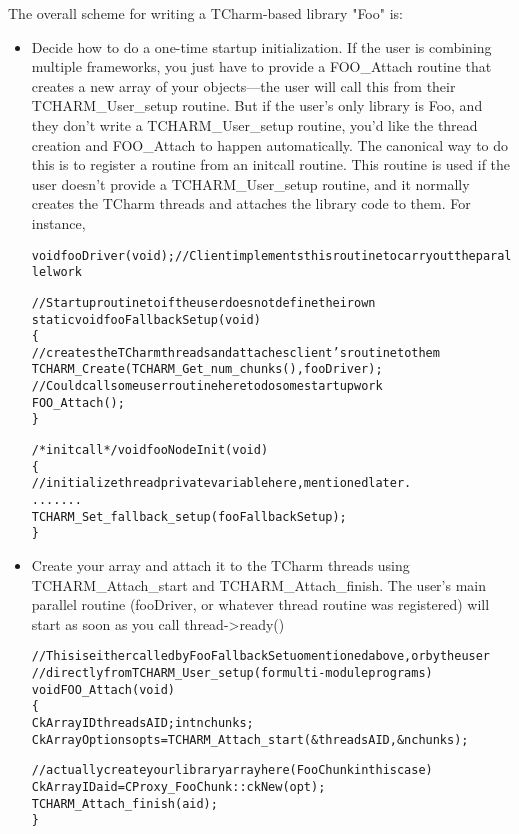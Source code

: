 \documentclass[10pt]{article}
\begin{document}
The overall scheme for writing a TCharm-based library "Foo" is:

\begin{itemize}
\item Decide how to do a one-time startup initialization.  If the user
is combining multiple frameworks, you just have to provide a FOO\_Attach
routine that creates a new array of your objects---the user will call this
from their TCHARM\_User\_setup routine.  But if the user's only library is 
Foo, and they don't write a TCHARM\_User\_setup routine, you'd like the 
thread creation and FOO\_Attach to happen automatically.  The canonical way to do 
this is to register a  routine from an initcall routine. 
This routine is used if the user doesn't provide a TCHARM\_User\_setup routine,
and it normally creates the TCharm threads and attaches the library code to them. 
For instance,

\begin{alltt}
void fooDriver(void); //Client implements this routine to carry out the parallel work

//Startup routine to if the user does not define their own
static void fooFallbackSetup(void)
\{
  //creates the TCharm threads and attaches client's routine to them
  TCHARM\_Create(TCHARM\_Get_num_chunks(), fooDriver);
  //Could call some user routine here to do some startup work
  FOO\_Attach();
\}

/*initcall*/ void fooNodeInit(void)
\{
  //initialize thread private variable here, mentioned later.
  .......
  TCHARM\_Set\_fallback\_setup(fooFallbackSetup);
\}
\end{alltt}

\item Create your array and attach it to the TCharm threads using
TCHARM\_Attach\_start and TCHARM\_Attach\_finish. The user's main 
parallel routine (fooDriver, or whatever thread routine was registered) 
will start as soon as you call thread->ready()

\begin{alltt}
//This is either called by FooFallbackSetuo mentioned above, or by the user
//directly from TCHARM\_User\_setup (for multi-module programs)
void FOO\_Attach(void)
\{
  CkArrayID threadsAID; int nchunks;
  CkArrayOptions opts=TCHARM\_Attach\_start(&threadsAID,&nchunks);
  
  //actually create your library array here (FooChunk in this case)
  CkArrayID aid = CProxy\_FooChunk::ckNew(opt);
  TCHARM\_Attach\_finish(aid);
\}
\end{alltt}


\end{itemize}
\end{document}
